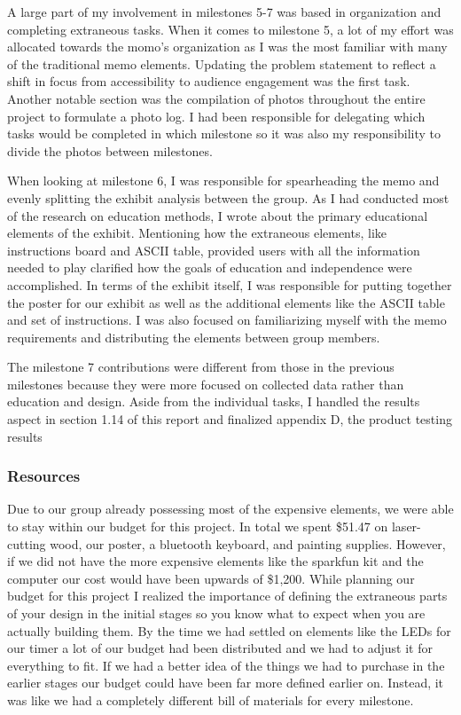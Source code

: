 \documentclass[conference]{IEEEtran}
\begin{document}
\par A large part of my involvement in milestones 5-7 was based in organization and completing extraneous tasks. When it comes to milestone 5, a lot of my effort was allocated towards the momo’s organization as I was the most familiar with many of the traditional memo elements. Updating the problem statement to reflect a shift in focus from accessibility to audience engagement was the first task. Another notable section was the compilation of photos throughout the entire project to formulate a photo log. I had been responsible for delegating which tasks would be completed in which milestone so it was also my responsibility to divide the photos between milestones. 
\par When looking at milestone 6, I was responsible for spearheading the memo and evenly splitting the exhibit analysis between the group. As I had conducted most of the research on education methods, I wrote about the primary educational elements of the exhibit. Mentioning how the extraneous elements, like instructions board and ASCII table, provided users with all the information needed to play clarified how the goals of education and independence were accomplished. In terms of the exhibit itself, I was responsible for putting together the poster for our exhibit as well as the additional elements like the ASCII table and set of instructions. I was also focused on familiarizing myself with the memo requirements and distributing the elements between group members. 
\par The milestone 7 contributions were different from those in the previous milestones because they were more focused on collected data rather than education and design. Aside from the individual tasks, I handled the results aspect in section 1.14 of this report and finalized appendix D, the product testing results

\subsubsection{Resources}

\par Due to our group already possessing most of the expensive elements, we were able to stay within our budget for this project. In total we spent \$51.47 on laser-cutting wood, our poster, a bluetooth keyboard, and painting supplies. However, if we did not have the more expensive elements like the sparkfun kit and the computer our cost would have been upwards of \$1,200. While planning our budget for this project I realized the importance of defining the extraneous parts of your design in the initial stages so you know what to expect when you are actually building them. By the time we had settled on elements like the LEDs for our timer a lot of our budget had been distributed and we had to adjust it for everything to fit. If we had a better idea of the things we had to purchase in the earlier stages our budget could have been far more defined earlier on. Instead, it was like we had a completely different bill of materials for every milestone.
\end{document}
